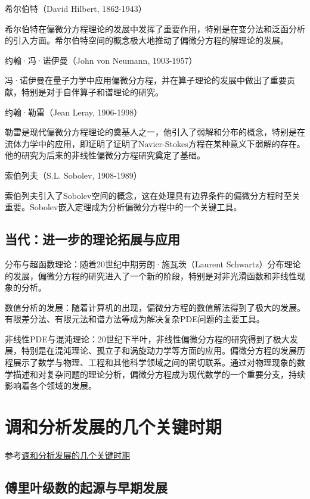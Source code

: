 \documentclass{article}
\begin{document}
希尔伯特（David Hilbert, 1862-1943）

希尔伯特在偏微分方程理论的发展中发挥了重要作用，特别是在变分法和泛函分析的引入方面。希尔伯特空间的概念极大地推动了偏微分方程的解理论的发展。

约翰·冯·诺伊曼（John von Neumann, 1903-1957）

冯·诺伊曼在量子力学中应用偏微分方程，并在算子理论的发展中做出了重要贡献，特别是对于自伴算子和谱理论的研究。

约翰·勒雷（Jean Leray, 1906-1998）

勒雷是现代偏微分方程理论的奠基人之一，他引入了弱解和分布的概念，特别是在流体力学中的应用，即证明了证明了Navier-Stokes方程在某种意义下弱解的存在。他的研究为后来的非线性偏微分方程研究奠定了基础。

索伯列夫（S.L. Sobolev, 1908-1989）

索伯列夫引入了Sobolev空间的概念，这在处理具有边界条件的偏微分方程时至关重要。Sobolev嵌入定理成为分析偏微分方程中的一个关键工具。

\subsection{当代：进一步的理论拓展与应用}

分布与超函数理论：随着20世纪中期劳朗·施瓦茨（Laurent Schwartz）分布理论的发展，偏微分方程的研究进入了一个新的阶段，特别是对非光滑函数和非线性现象的分析。

数值分析的发展：随着计算机的出现，偏微分方程的数值解法得到了极大的发展。有限差分法、有限元法和谱方法等成为解决复杂PDE问题的主要工具。

非线性PDE与混沌理论：20世纪下半叶，非线性偏微分方程的研究得到了极大发展，特别是在混沌理论、孤立子和涡旋动力学等方面的应用。偏微分方程的发展历程展示了数学与物理、工程和其他科学领域之间的密切联系。通过对物理现象的数学描述和对复杂问题的理论分析，偏微分方程成为现代数学的一个重要分支，持续影响着各个领域的发展。

\section{调和分析发展的几个关键时期}

参考\href{https://mp.weixin.qq.com/s/0r16lz11-_KckEsZ2yt28w}{调和分析发展的几个关键时期}

\subsection{傅里叶级数的起源与早期发展}
\end{document}
